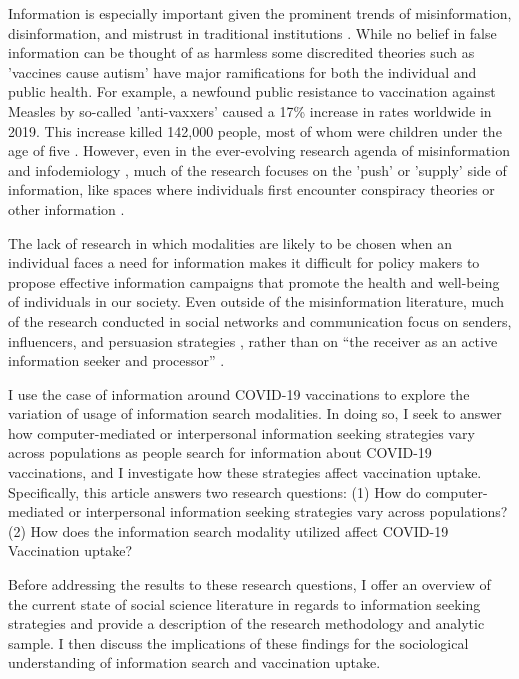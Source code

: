 Information is especially important given the prominent trends of
misinformation, disinformation, and mistrust in traditional institutions
\citep{starbird19, kata10}. While no belief in false information can be thought
of as harmless \citep{douglas21} some discredited theories such as 'vaccines
cause autism' have major ramifications for both the individual and public
health. For example, a newfound public resistance to vaccination against Measles
by so-called 'anti-vaxxers' caused a 17\% increase in rates worldwide in 2019.
This increase killed  142,000 people, most of whom were children under the age
of five \citep{givetash19}. However, even in the ever-evolving research agenda
of misinformation and infodemiology \citep{eysenbach02}, much of the research
focuses on the 'push' or 'supply' side of information, like spaces where
individuals first encounter conspiracy theories or other information
\citep{johnsonOnlineCompetitionPro2020, broniatowski_etal20}.

The lack of research in which modalities are likely to be chosen when an
individual faces a need for information makes it difficult for policy makers to
propose effective information campaigns that promote the health and well-being
of individuals in our society. Even outside of the misinformation literature,
much of the research conducted in social networks and communication focus on
senders, influencers, and persuasion strategies
\citep{mertonManifestLatentFunctions1968, katzPersonalInfluencePart1955,
lazarsfeldPeopleChoice1944}, rather than on ``the receiver as an active
information seeker and processor''
\citep[][p. 344]{johnsonComprehensiveModelCancerRelated1993} \citep[for an exception,
see][]{eysenbach09}.

I use the case of information around COVID-19 vaccinations to explore the
variation of usage of information search modalities. In doing so, I seek to
answer how computer-mediated or interpersonal information seeking strategies
vary across populations as people search for information about COVID-19
vaccinations, and I investigate how these strategies affect vaccination uptake.
Specifically, this article answers two research questions: (1) How do
computer-mediated or interpersonal information seeking strategies vary across
populations? (2) How does the information search modality utilized affect
COVID-19 Vaccination uptake?

Before addressing the results to these research questions, I offer an overview
of the current state of social science literature in regards to information
seeking strategies and provide a description of the research methodology and
analytic sample. I then discuss the implications of these findings for the
sociological understanding of information search and vaccination uptake.


